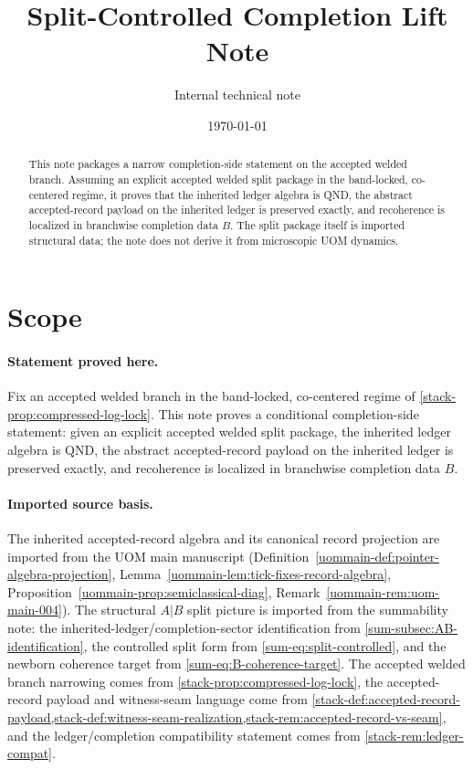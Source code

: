 \documentclass[11pt]{article}
\title{Split-Controlled Completion Lift Note}
\author{Internal technical note}
\date{\today}
\theoremstyle{definition}
\theoremstyle{plain}
\theoremstyle{remark}
\newcommand{\1}{\mathbf 1}
\begin{document}
\maketitle

\begin{abstract}
This note packages a narrow completion-side statement on the accepted welded branch.
Assuming an explicit accepted welded split package in the band-locked, co-centered regime, it proves
that the inherited ledger algebra is QND, the abstract accepted-record payload on the inherited
ledger is preserved exactly, and recoherence is localized in branchwise completion data \(B\).
The split package itself is imported structural data; the note does not derive it from microscopic
UOM dynamics.
\end{abstract}

\tableofcontents

\section{Scope}
\label{sec:splitlift-scope}

\paragraph{Statement proved here.}
Fix an accepted welded branch in the band-locked, co-centered regime of
\cref{stack-prop:compressed-log-lock}.
This note proves a conditional completion-side statement:
given an explicit accepted welded split package, the inherited ledger algebra is QND, the abstract
accepted-record payload on the inherited ledger is preserved exactly, and recoherence is localized
in branchwise completion data \(B\).

\paragraph{Imported source basis.}
The inherited accepted-record algebra and its canonical record projection are imported from the UOM
main manuscript
\textup{(Definition~\ref{uommain-def:pointer-algebra-projection},
Lemma~\ref{uommain-lem:tick-fixes-record-algebra},
Proposition~\ref{uommain-prop:semiclassical-diag},
Remark~\ref{uommain-rem:uom-main-004})}.
The structural \(A|B\) split picture is imported from the summability note:
the inherited-ledger/completion-sector identification from \cref{sum-subsec:AB-identification},
the controlled split form from \eqref{sum-eq:split-controlled},
and the newborn coherence target from \eqref{sum-eq:B-coherence-target}.
The accepted welded branch narrowing comes from \cref{stack-prop:compressed-log-lock},
the accepted-record payload and witness-seam language come from
\cref{stack-def:accepted-record-payload,stack-def:witness-seam-realization,stack-rem:accepted-record-vs-seam},
and the ledger/completion compatibility statement comes from \cref{stack-rem:ledger-compat}.
\end{document}
